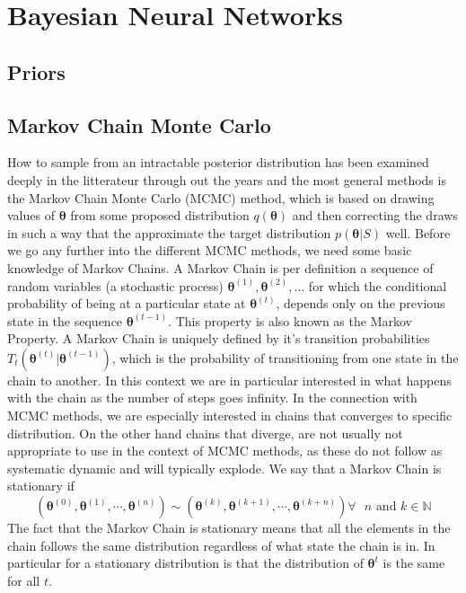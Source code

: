 \chapter{Bayesian Neural Networks}
\clearpage
\section{Priors}
\section{Markov Chain Monte Carlo}\label{sec:MCMC}
How to sample from an intractable posterior distribution has been examined deeply in the litterateur through out the years and the most general methods is the Markov Chain Monte Carlo (MCMC) method, which is based on drawing values of $\boldsymbol{\theta}$ from some proposed distribution $q(\boldsymbol{\theta})$ and then correcting the draws in such a way that the approximate the target distribution $p(\boldsymbol{\theta}|S)$ well. Before we go any further into the different MCMC methods, we need some basic knowledge of Markov Chains. A Markov Chain is per definition a sequence of random variables (a stochastic process) $\boldsymbol{\theta}^{(1)},\boldsymbol{\theta}^{(2)}, \ldots$ for which the conditional probability of being at a particular state at $\boldsymbol{\theta}^{(t)}$, depends only on the previous state in the sequence $\boldsymbol{\theta}^{(t-1)}$. This property is also known as the Markov Property. A Markov Chain is uniquely defined by it's transition probabilities $T_t(\boldsymbol{\theta}^{(t)}|\boldsymbol{\theta}^{(t-1)}) $, which is the probability of transitioning from one state in the chain to another. In this context we are in particular interested in what happens with the chain as the number of steps goes infinity. In the connection with MCMC methods, we are especially interested in chains that converges to specific distribution. On the other hand chains that diverge, are not usually not appropriate to use in the context of MCMC methods, as these do not follow as systematic dynamic and will typically explode. We say that a Markov Chain is stationary if
\begin{equation*}
    \left(\boldsymbol{\theta}^{(0)},\boldsymbol{\theta}^{(1)}, \cdots, \boldsymbol{\theta}^{(n)}\right) \sim\left(\boldsymbol{\theta}^{(k)}, \boldsymbol{\theta}^{(k+1)}, \cdots, \boldsymbol{\theta}^{(k+n)}\right) \forall \text{ } n \text{ and } k \in \mathbb{N}
\end{equation*}
The fact that the Markov Chain is stationary means that all the elements in the chain follows the same distribution regardless of what state the chain is in. In particular for a stationary distribution is that the distribution of $\boldsymbol{\theta}^t$ is the same for all $t$. \\
